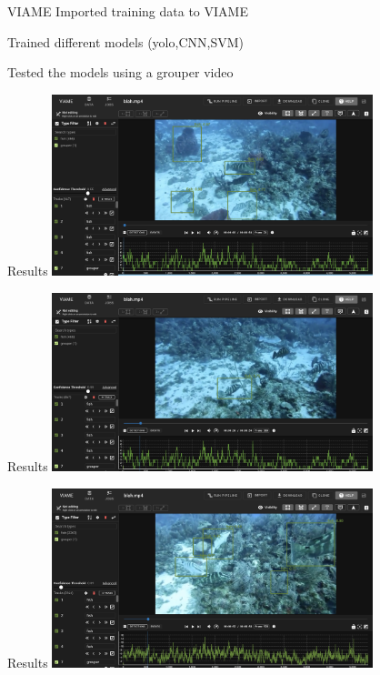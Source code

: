 \begin{frame}{VIAME}
    Imported training data to VIAME 

    Trained different models (yolo,CNN,SVM)

    Tested the models using a grouper video

\end{frame}


\begin{frame}{Results}
    \centering
    \includegraphics[height=0.7\textheight,width=0.7\textwidth,keepaspectratio]{images/gm2-1.png}

\end{frame}

\begin{frame}{Results}
    \centering
    \includegraphics[height=0.7\textheight,width=0.7\textwidth,keepaspectratio]{images/gm2-2.png}

\end{frame}
\begin{frame}{Results}
    \centering
    \includegraphics[height=0.7\textheight,width=0.7\textwidth,keepaspectratio]{images/gm2-3.png}

\end{frame}


